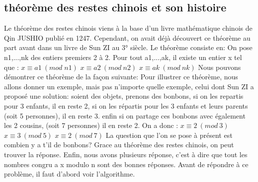 \documentclass[a4paper, 11pt]{article}
\begin{document}
\subsection{théorème des restes chinois et son histoire}
Le théorème des restes chinois viens à la base d’un livre mathématique chinois de Qin JUSHIO publié en 1247. Cependant, on avait déjà découvert ce théorème au part avant dans un livre de Sun ZI au 3° siècle. Le théorème consiste en:
On pose n1,...,nk des entiers premiers 2 à 2. Pour tout a1,...,ak, il existe un entier x tel que :
\newline
$ x\equiv a1 \: (mod \;  n1)$ 
\newline
$ x\equiv a2 \: (mod \: n2)$
\newline
$ x \equiv ak \:(mod\: nk)$
\newline
Nous pouvons démontrer ce théorème de la façon suivante:
\newline
\newline
Pour illustrer ce théorème, nous allons donner un exemple, mais pas n'importe quelle exemple, celui dont Sun ZI a proposé une solution:
\newline
soient des objets, prenons des bonbons, si on les repartis pour 3 enfants, il en reste 2, si on les répartis
pour les 3 enfants et leurs parents (soit 5 personnes), il en reste 3. enfin si on partage ces bonbons avec également les 2 cousins,
(soit 7 personnes) il en reste 2. On a donc :
\newline 
$ x\equiv 2 \: (mod \:  3)$ 
\newline
$ x\equiv 3 \: (mod \: 5)$
\newline
$ x\equiv 2 \:(mod\: 7)$
\newline
La question que l'on se pose à présent est combien y a t'il de bonbons?
\newline
Grace au théorème des restes chinois, on peut trouver la réponse. Enfin, nous avons plusieurs réponse, c'est à dire que tout les nombres congru a x modulo n sont des bonnes réponses.
Avant de répondre à ce problème, il faut d'abord voir l'algorithme.

\newpage
\end{document}
